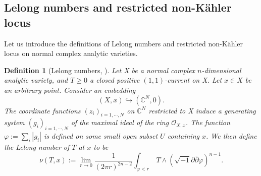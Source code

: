 \documentclass[12pt]{amsart}
\numberwithin{equation}{section}
\theoremstyle{definition}
\theoremstyle{plain}
\newtheorem{definition}  [theorem]     {Definition}
\newtheorem*{thm A*}{Theorem A}
\newtheorem*{thm B*}{Theorem B}
\newtheorem*{thm C*}{Theorem C}
\newtheorem*{thm D*}{Theorem D}
\theoremstyle{definition}
\renewcommand{\1}{\mathds{1}}
\renewcommand{\>}{\rightarrow}
\begin{document}



\subsection{Lelong numbers and restricted non-K\"ahler locus}
Let us introduce the definitions of Lelong numbers and restricted non-K\"ahler locus on normal complex analytic varieties. 
\begin{definition}[{Lelong numbers, \cite[Définition 2]{Demailly82}}]
Let X be a normal complex $n$-dimensional analytic variety, and ${T} \geq 0$ a closed positive $(1,1)$-current on X. Let ${x} \in {X}$ be an arbitrary point. Consider an embedding
$$
({X}, {x}) \hookrightarrow\left(\mathbb{C}^{{N}}, 0\right).
$$
The coordinate functions $\left({z}_{{i}}\right)_{{i}=1,\cdots, {N}}$ on $\mathbb{C}^{{N}}$ restricted to X induce a generating system $\left({g}_{{i}}\right)_{{i}=1,\cdots, {N}}$ of the maximal ideal of the ring $\mathcal{O}_{{X}, {x}}$. The function $\varphi:=\sum_{{i}}\left|{g}_{{i}}\right|$ is defined on some small open subset $U$ containing $x$. We then define the \emph{Lelong number} of $T$ at $x$ to be
$$
\nu({T},{x}):=\lim _{{r} \rightarrow 0} \frac{1}{(2 \pi {r})^{2 {n}-2}} \int_{\varphi<{r}} {~T} \wedge(\sqrt{-1} \partial \bar{\partial} \varphi)^{{n}-1}.$$
\end{definition}
\end{document}
